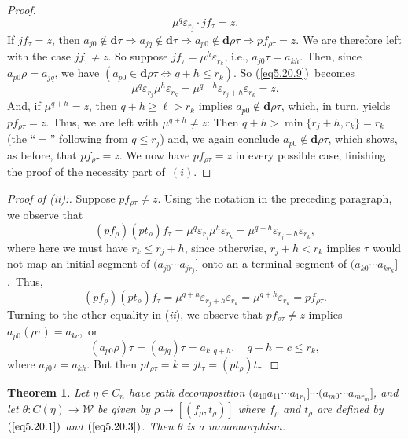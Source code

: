 \documentclass{surv-l}
\numberwithin{equation}{section}
\numberwithin{table}{section}
\numberwithin{figure}{section}
\theoremstyle{plain}
\newtheorem{theorem}[equation]{Theorem}
\theoremstyle{definition}
\begin{document}
\begin{proof}
\[
\mu^{q}\varepsilon_{r_{j}}\cdot jf_{\tau}=z.
\]
If $jf_{\tau}=z$, then $a_{j0}\not\in \mathbf{d}\tau\Rightarrow
a_{jq}\not\in \mathbf{d}\tau\Rightarrow a_{p0}\not\in
\mathbf{d}\rho\tau\Rightarrow pf_{\rho\tau}=z$. We are therefore
left with the case $jf_{\tau}\neq z$. So suppose
$jf_{\tau}=\mu^{h}\varepsilon_{r_{k}}$, i.e., $a_{j0}\tau=a_{kh}$.
Then, since $a_{p0}\rho=a_{jq}$, we have $(a_{p0}\in
\mathbf{d}\rho\tau\Leftrightarrow q+h\leq r_{k})$. So
(\ref{eq5.20.9})~becomes
\[
\mu^{q}\varepsilon_{r_{j}}\mu^{h}\varepsilon_{r_{k}}=\mu^{q+h}
\varepsilon_{r_{j}+h}\varepsilon_{r_{k}}=z.
\]
And, if $\mu^{q+h}=z$, then $q+h\geq\ell>r_{k}$ implies
$a_{p0}\not\in \mathbf{d}\rho\tau$, which, in turn, yields
$pf_{\rho\tau}=z$. Thus, we are left with $\mu^{q+h}\neq z$: Then
$q+h> \min\{r_{j}+h, r_{k}\}=r_{k}$ (the ``$=$'' following from $q\leq
r_{j}$) and, we again conclude $a_{p0}\not\in \mathbf{d}\rho\tau$,
which shows, as before, that $pf_{\rho\tau}=z$. We now have
$pf_{\rho\tau}=z$ in every possible case, finishing the proof of
the necessity part of~$(i)$.
\end{proof}

\begin{proof}[Proof of (\emph{ii}):] Suppose $pf_{\rho\tau}\neq z$. Using the
notation in the preceding paragraph, we observe that
\[
(pf_{\rho})(pt_{\rho})f_{\tau}=\mu^{q}\varepsilon_{r_{j}}\mu^{h}\varepsilon_{r_{k}}
=\mu^{q+h}\varepsilon_{r_{j}+h}\varepsilon_{r_{k}},
\]
where here we must have $r_{k}\leq r_{j}+h$, since otherwise,
$r_{j}+h<r_{k}$ implies $\tau$ would not map an initial segment of
$(a_{j0}\cdots a_{jr_{j}}]$ onto an a terminal segment of
$(a_{k0}\cdots a_{kr_{k}}]$.~Thus,
\[
(pf_{\rho})(pt_{\rho})f_{\tau}=\mu^{q+h} \varepsilon_{r_{j}+h}\varepsilon_{r_{k}}
=\mu^{q+h}\varepsilon_{r_{k}}=pf_{\rho\tau}.
\]
Turning to the other equality in (\emph{ii}), we observe that
$pf_{\rho\tau}\neq z$ implies $a_{p0}(\rho\tau)=a_{kc}$,~or
\[
(a_{p0}\rho)\tau=(a_{jq})\tau=a_{k,q+h},\quad q+h=c\leq r_{k},
\]
where $a_{j0}\tau=a_{kh}$. But then
$pt_{\rho\tau}=k=jt_{\tau}=(pt_{\rho})t_{\tau}.$
\end{proof}

\begin{theorem}\label{thm5.20.10}
Let $\eta\in C_{n}$ have path decomposition $(a_{10}a_{11}\cdots
a_{{1r}_{1}}]\cdots (a_{m0}\cdots a_{mr_{m}}]$, and let $\theta :
C(\eta)\rightarrow \mathcal{W}$ be given by
$\rho\mapsto[(f_{\rho}, t_{\rho})]$ where $f_{\rho}$ and
$t_{\rho}$ are defined by $(\ref{eq5.20.1})$ and
$(\ref{eq5.20.3})$. Then $\theta$ is a monomorphism.
\end{theorem}
\end{document}
